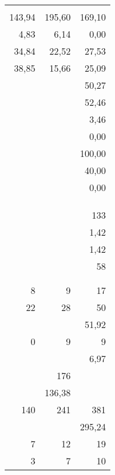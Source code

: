 \begin{tabular}{|r|r|r|}
	               &        &              \\
	        143,94 & 195,60 &       169,10 \\
	          4,83 &   6,14 &         0,00 \\
	         34,84 &  22,52 &        27,53 \\
	         38,85 &  15,66 &        25,09 \\
	               &        &        50,27 \\
	               &        &        52,46 \\
	               &        &         3,46 \\
	               &        &         0,00 \\
	               &        &       100,00 \\
	               &        &        40,00 \\
	               &        &         0,00 \\
	               &        &              \\
	               &        &              \\
	               &        &              \\
	               &        &          133 \\
	               &        &         1,42 \\
	               &        &         1,42 \\
	               &        &           58 \\
	               &        &              \\
	               &        &              \\
	             8 &      9 &           17 \\
	            22 &     28 &           50 \\
	               &        &        51,92 \\
	             0 &      9 &            9 \\
	               &        &         6,97 \\
	               &    176 &              \\
	               & 136,38 &              \\
	           140 &    241 &          381 \\
	               &        &       295,24 \\
	             7 &     12 &           19 \\
	             3 &      7 &           10 \\

\end{tabular}
